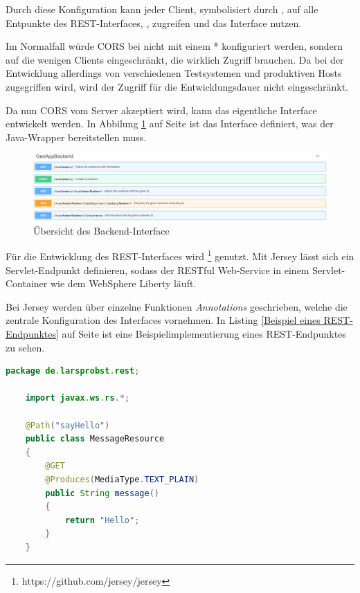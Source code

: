 Durch diese Konfiguration kann jeder Client, symbolisiert durch , auf alle Entpunkte des
REST-Interfaces, , zugreifen und das Interface nutzen.

Im Normalfall würde CORS bei  nicht mit einem * konfiguriert werden, sondern
auf die wenigen Clients eingeschränkt, die wirklich Zugriff brauchen. Da bei der Entwicklung allerdings von
verschiedenen Testsystemen und produktiven Hosts zugegriffen wird, wird der Zugriff für die Entwicklungsdauer nicht
eingeschränkt.

Da nun CORS vom Server akzeptiert wird, kann das eigentliche Interface entwickelt werden. In Abbilung
\ref{fig:swagger_genappbackend} auf Seite \pageref{fig:swagger_genappbackend} ist das Interface definiert, was der
Java-Wrapper bereitstellen muss.

\begin{figure}[h]
  \centering
    \includegraphics[scale=0.38]{images/kapitel_4/swagger_genappbackend.png}
  \caption{Übersicht des Backend-Interface}
  \label{fig:swagger_genappbackend}
\end{figure}

Für die Entwicklung des REST-Interfaces wird \footnote{https://github.com/jersey/jersey} genutzt. Mit Jersey
lässt sich ein Servlet-Endpunkt definieren, sodass der RESTful Web-Service in einem Servlet-Container wie dem WebSphere
Liberty läuft.

Bei Jersey werden über einzelne Funktionen \textit{Annotations} geschrieben, welche die zentrale Konfiguration des
Interfaces vornehmen. In Listing \ref{Beispiel eines REST-Endpunktes} auf Seite \pageref{Beispiel eines REST-Endpunktes}
ist eine Beispielimplementierung eines REST-Endpunktes zu sehen.

\begin{lstlisting}[language=java, caption=Beispiel eines REST-Endpunktes, label=Beispiel eines REST-Endpunktes]
    package de.larsprobst.rest;

    import javax.ws.rs.*;

    @Path("sayHello")
    public class MessageResource
    {
        @GET
        @Produces(MediaType.TEXT_PLAIN)
        public String message()
        {
            return "Hello";
        }
    }
\end{lstlisting}

